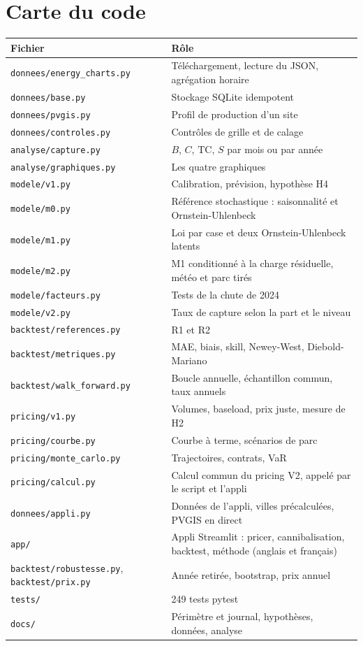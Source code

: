 \documentclass[11pt,a4paper]{article}
\newcommand{\code}[1]{\texttt{\small #1}}
\newcommand{\TC}{\mathrm{TC}}
\begin{document}
\section{Carte du code}

\begin{center}
\small
\begin{tabularx}{\linewidth}{lY}
\toprule
\textbf{Fichier} & \textbf{Rôle} \\
\midrule
\code{donnees/energy\_charts.py} & Téléchargement, lecture du JSON, agrégation horaire \\
\code{donnees/base.py} & Stockage SQLite idempotent \\
\code{donnees/pvgis.py} & Profil de production d'un site \\
\code{donnees/controles.py} & Contrôles de grille et de calage \\
\code{analyse/capture.py} & $B$, $C$, $\TC$, $S$ par mois ou par année \\
\code{analyse/graphiques.py} & Les quatre graphiques \\
\code{modele/v1.py} & Calibration, prévision, hypothèse H4 \\
\code{modele/m0.py} & Référence stochastique : saisonnalité et Ornstein-Uhlenbeck \\
\code{modele/m1.py} & Loi par case et deux Ornstein-Uhlenbeck latents \\
\code{modele/m2.py} & M1 conditionné à la charge résiduelle, météo et parc tirés \\
\code{modele/facteurs.py} & Tests de la chute de 2024 \\
\code{modele/v2.py} & Taux de capture selon la part et le niveau \\
\code{backtest/references.py} & R1 et R2 \\
\code{backtest/metriques.py} & MAE, biais, skill, Newey-West, Diebold-Mariano \\
\code{backtest/walk\_forward.py} & Boucle annuelle, échantillon commun, taux annuels \\
\code{pricing/v1.py} & Volumes, baseload, prix juste, mesure de H2 \\
\code{pricing/courbe.py} & Courbe à terme, scénarios de parc \\
\code{pricing/monte\_carlo.py} & Trajectoires, contrats, VaR \\
\code{pricing/calcul.py} & Calcul commun du pricing V2, appelé par le script et l'appli \\
\code{donnees/appli.py} & Données de l'appli, villes précalculées, PVGIS en direct \\
\code{app/} & Appli Streamlit : pricer, cannibalisation, backtest, méthode (anglais et français) \\
\code{backtest/robustesse.py}, \code{backtest/prix.py} & Année retirée, bootstrap, prix annuel \\
\code{tests/} & 249 tests pytest \\
\code{docs/} & Périmètre et journal, hypothèses, données, analyse \\
\bottomrule
\end{tabularx}
\end{center}
\end{document}

